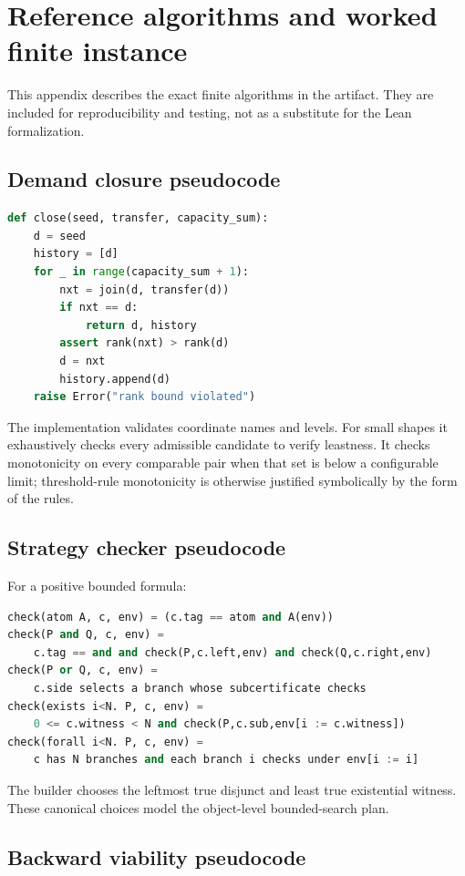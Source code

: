 \section{Reference algorithms and worked finite instance}
\label{app:reference}

This appendix describes the exact finite algorithms in the artifact.  They are
included for reproducibility and testing, not as a substitute for the Lean
formalization.

\subsection{Demand closure pseudocode}

\begin{lstlisting}[language=Python]
def close(seed, transfer, capacity_sum):
    d = seed
    history = [d]
    for _ in range(capacity_sum + 1):
        nxt = join(d, transfer(d))
        if nxt == d:
            return d, history
        assert rank(nxt) > rank(d)
        d = nxt
        history.append(d)
    raise Error("rank bound violated")
\end{lstlisting}
The implementation validates coordinate names and levels.  For small shapes it
exhaustively checks every admissible candidate to verify leastness.  It checks
monotonicity on every comparable pair when that set is below a configurable
limit; threshold-rule monotonicity is otherwise justified symbolically by the
form of the rules.

\subsection{Strategy checker pseudocode}

For a positive bounded formula:
\begin{lstlisting}[language=Python]
check(atom A, c, env) = (c.tag == atom and A(env))
check(P and Q, c, env) =
    c.tag == and and check(P,c.left,env) and check(Q,c.right,env)
check(P or Q, c, env) =
    c.side selects a branch whose subcertificate checks
check(exists i<N. P, c, env) =
    0 <= c.witness < N and check(P,c.sub,env[i := c.witness])
check(forall i<N. P, c, env) =
    c has N branches and each branch i checks under env[i := i]
\end{lstlisting}
The builder chooses the leftmost true disjunct and least true existential
witness.  These canonical choices model the object-level bounded-search plan.

\subsection{Backward viability pseudocode}

